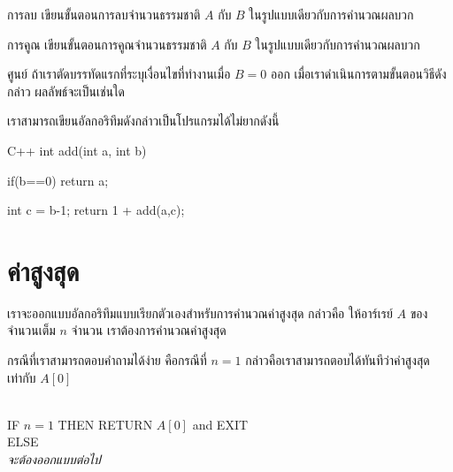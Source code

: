 \begin{quiz}{การ{\wbr}ลบ}
เขียน{\wbr}ขั้นตอน{\wbr}การ{\wbr}ลบ{\wbr}จำนวน{\wbr}ธรรมชาติ $A$ กับ $B$ ใน{\wbr}รูปแบบ{\wbr}เดียวกับ{\wbr}การ{\wbr}คำนวณ{\wbr}ผลบวก{\wbr}
\end{quiz}

\begin{quiz}{การ{\wbr}คูณ}
เขียน{\wbr}ขั้นตอน{\wbr}การ{\wbr}คูณ{\wbr}จำนวน{\wbr}ธรรมชาติ $A$ กับ $B$ ใน{\wbr}รูปแบบ{\wbr}เดียวกับ{\wbr}การ{\wbr}คำนวณ{\wbr}ผลบวก{\wbr}
\end{quiz}

\begin{quiz}{ศูนย์}
ถ้า{\wbr}เรา{\wbr}ตัด{\wbr}บรรทัด{\wbr}แรก{\wbr}ที่{\wbr}ระบุ{\wbr}เงื่อนไข{\wbr}ที่ทำงาน{\wbr}เมื่อ $B=0$ ออก  เมื่อ{\wbr}เรา{\wbr}ดำเนินการ{\wbr}ตาม{\wbr}ขั้นตอนวิธี{\wbr}ดังกล่าว ผลลัพธ์{\wbr}จะ{\wbr}เป็น{\wbr}เช่น{\wbr}ใด{\wbr}
\end{quiz}

เรา{\wbr}สามารถ{\wbr}เขียน{\wbr}อัล{\wbr}กอ{\wbr}ริ{\wbr}ทึม{\wbr}ดังกล่าว{\wbr}เป็น{\wbr}โปรแกรม{\wbr}ได้{\wbr}ไม่{\wbr}ยาก{\wbr}ดังนี้{\wbr}

\latintext
\begin{codelist}{C++}{}
int add(int a, int b)
{
  if(b==0)
    return a;

  int c = b-1;
  return 1 + add(a,c);
}
\end{codelist}
\thaitext

\section{ค่าสูงสุด}

เรา{\wbr}จะ{\wbr}ออกแบบ{\wbr}อัล{\wbr}กอ{\wbr}ริ{\wbr}ทึม{\wbr}แบบ{\wbr}เรียก{\wbr}ตัวเอง{\wbr}สำหรับ{\wbr}การ{\wbr}คำนวณ{\wbr}ค่าสูงสุด กล่าวคือ{\wbr}
ให้{\wbr}อาร์เรย์ $A$ ของ{\wbr}จำนวนเต็ม $n$ จำนวน เรา{\wbr}ต้องการ{\wbr}คำนวณ{\wbr}ค่าสูงสุด{\wbr}

กรณี{\wbr}ที่{\wbr}เรา{\wbr}สามารถ{\wbr}ตอบ{\wbr}คำถาม{\wbr}ได้{\wbr}ง่าย คือ{\wbr}กรณี{\wbr}ที่ $n=1$
กล่าวคือ{\wbr}เรา{\wbr}สามารถ{\wbr}ตอบ{\wbr}ได้{\wbr}ทันที{\wbr}ว่า{\wbr}ค่าสูงสุด{\wbr}เท่า{\wbr}กับ $A[0]$

\begin{algt}
\\
\hspace*{0.2in} IF $n=1$ THEN RETURN $A[0]$ and EXIT\\
\hspace*{0.2in} ELSE\\
\hspace*{0.2in}\hspace*{0.2in} {\em จะ{\wbr}ต้อง{\wbr}ออกแบบ{\wbr}ต่อไป}
\end{algt}

